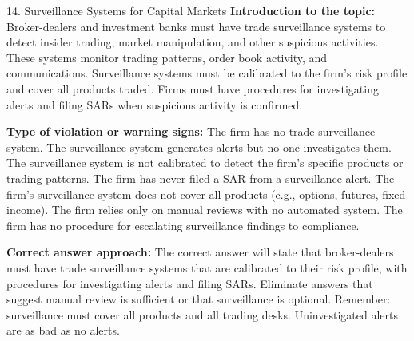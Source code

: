 \documentclass[11pt,a4paper]{beamer}
\begin{document}
\begin{frame}{14. Surveillance Systems for Capital Markets}
\tiny
\noindent\textbf{Introduction to the topic:} Broker-dealers and investment banks must have trade surveillance systems to detect insider trading, market manipulation, and other suspicious activities. These systems monitor trading patterns, order book activity, and communications. Surveillance systems must be calibrated to the firm's risk profile and cover all products traded. Firms must have procedures for investigating alerts and filing SARs when suspicious activity is confirmed.

\vspace{0.1cm}
\noindent\textbf{Type of violation or warning signs:} The firm has no trade surveillance system. The surveillance system generates alerts but no one investigates them. The surveillance system is not calibrated to detect the firm's specific products or trading patterns. The firm has never filed a SAR from a surveillance alert. The firm's surveillance system does not cover all products (e.g., options, futures, fixed income). The firm relies only on manual reviews with no automated system. The firm has no procedure for escalating surveillance findings to compliance.

\vspace{0.1cm}
\noindent\textbf{Correct answer approach:} The correct answer will state that broker-dealers must have trade surveillance systems that are calibrated to their risk profile, with procedures for investigating alerts and filing SARs. Eliminate answers that suggest manual review is sufficient or that surveillance is optional. Remember: surveillance must cover all products and all trading desks. Uninvestigated alerts are as bad as no alerts.
\end{frame}
\end{document}
